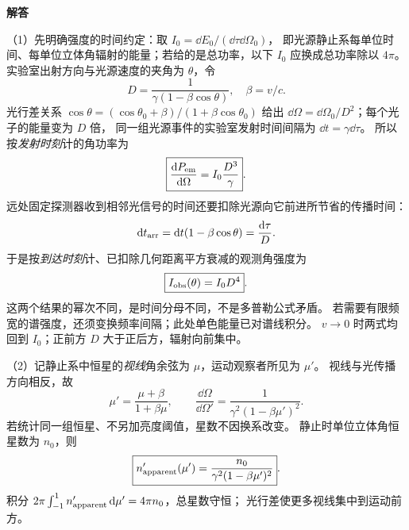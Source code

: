 \begin{advsolution}
\begin{center}\begin{minipage}{.96\linewidth}\centering
\raggedright{\bfseries\color{DeepBlue}解答}\par\smallskip\centering

\label{advA6:quality:A6-source-more:a1}
\end{minipage}\end{center}

（1）先明确强度的时间约定：取 $I_0=\dd E_0/(\dd\tau\dd\Omega_0)$，
即光源静止系每单位时间、每单位立体角辐射的能量；若给的是总功率，以下 $I_0$ 应换成总功率除以 $4\pi$。
实验室出射方向与光源速度的夹角为 $\theta$，令
\[
 D=\frac1{\gamma(1-\beta\cos\theta)},\quad \beta=v/c.
\]
光行差关系 $\cos\theta=(\cos\theta_0+\beta)/(1+\beta\cos\theta_0)$ 给出
$\dd\Omega=\dd\Omega_0/D^2$；每个光子的能量变为 $D$ 倍，
同一组光源事件的实验室发射时间间隔为 $\dd t=\gamma\dd\tau$。
所以按\emph{发射时刻}计的角功率为
\[
 \boxed{\frac{\mathop{}\!\mathrm d P_{\rm em}}{\mathop{}\!\mathrm d\Omega}=I_0\frac{D^3}{\gamma}}.
\]
远处固定探测器收到相邻光信号的时间还要扣除光源向它前进所节省的传播时间：
\[
 \mathop{}\!\mathrm d t_{\rm arr}=\mathop{}\!\mathrm d t(1-\beta\cos\theta)=\frac{\mathop{}\!\mathrm d\tau}{D}.
\]
于是按\emph{到达时刻}计、已扣除几何距离平方衰减的观测角强度为
\[
 \boxed{I_{\rm obs}(\theta)=I_0D^4}.
\]
这两个结果的幂次不同，是时间分母不同，不是多普勒公式矛盾。
若需要有限频宽的谱强度，还须变换频率间隔；此处单色能量已对谱线积分。
$v\to0$ 时两式均回到 $I_0$；正前方 $D$ 大于正后方，辐射向前集中。

（2）记静止系中恒星的\emph{视线}角余弦为 $\mu$，运动观察者所见为 $\mu'$。
视线与光传播方向相反，故
\[
 \mu'=\frac{\mu+\beta}{1+\beta\mu},\qquad
 \frac{\dd\Omega}{\dd\Omega'}=
 \frac1{\gamma^2(1-\beta\mu')^2}.
\]
若统计同一组恒星、不另加亮度阈值，星数不因换系改变。
静止时单位立体角恒星数为 $n_0$，则
\[
 \boxed{n'_{\rm apparent}(\mu')=
 \frac{n_0}{\gamma^2(1-\beta\mu')^2}}.
\]
积分 $2\pi\int_{-1}^1n'_{\rm apparent}\mathop{}\!\mathrm d\mu'=4\pi n_0$，总星数守恒；
光行差使更多视线集中到运动前方。


\end{advsolution}
